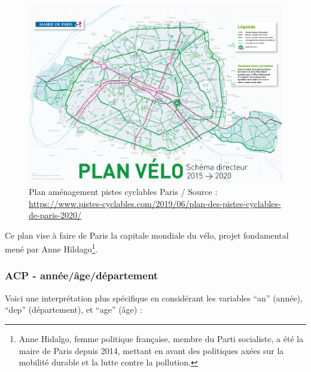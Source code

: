 \documentclass[french,]{compterendu}
\let\rmarkdownfootnote\footnote%
\def\footnote{\protect\rmarkdownfootnote}
\theoremstyle{urcastyle}
\theoremstyle{remark}
\begin{document}
\begin{figure}
\centering
\includegraphics{images/VELO.png}
\caption{Plan aménagement pistes cyclables Paris / Source : \url{https://www.pistes-cyclables.com/2019/06/plan-des-pistes-cyclables-de-paris-2020/}}
\end{figure}

Ce plan vise à faire de Paris la capitale mondiale du vélo, projet fondamental mené par Anne Hildago\footnote{Anne Hidalgo, femme politique française, membre du Parti socialiste, a été la maire de Paris depuis 2014, mettant en avant des politiques axées sur la mobilité durable et la lutte contre la pollution.}.

\newpage

\hypertarget{acp---annuxe9euxe2geduxe9partement}{%
\subsubsection{ACP - année/âge/département}\label{acp---annuxe9euxe2geduxe9partement}}

Voici une interprétation plus spécifique en considérant les variables ``an'' (année), ``dep'' (département), et ``age'' (âge) :
\end{document}
